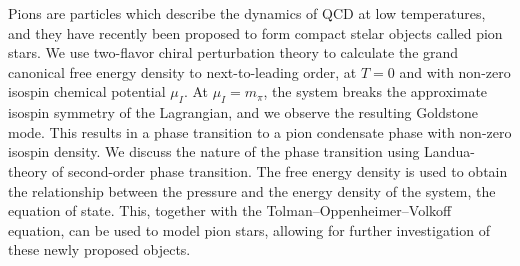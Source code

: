 Pions are particles which describe the dynamics of QCD at low temperatures, and they have recently been proposed to form compact stelar objects called pion stars.
We use two-flavor chiral perturbation theory to calculate the grand canonical free energy density to next-to-leading order, at $T = 0$ and with non-zero isospin chemical potential $\mu_I$.
At $\mu_I = m_\pi$, the system breaks the approximate isospin symmetry of the Lagrangian, and we observe the resulting Goldstone mode.
This results in a phase transition to a pion condensate phase with non-zero isospin density.
We discuss the nature of the phase transition using Landua-theory of second-order phase transition.
The free energy density is used to obtain the relationship between the pressure and the energy density of the system, the equation of state.
This, together with the Tolman–Oppenheimer–Volkoff equation, can be used to model pion stars, allowing for further investigation of these newly proposed objects.
